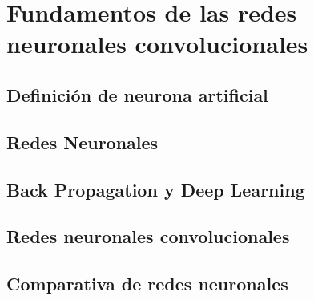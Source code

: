 \section{Fundamentos de las redes neuronales convolucionales}

\subsection{Definición de neurona artificial}
\subsection{Redes Neuronales}
\subsection{Back Propagation y Deep Learning}
\subsection{Redes neuronales convolucionales}
\subsection{Comparativa de redes neuronales}
